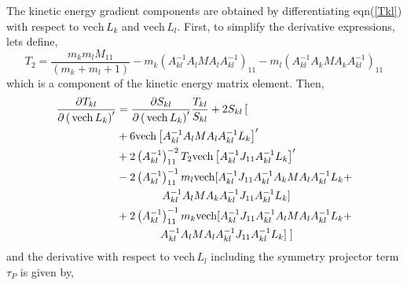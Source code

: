 \documentclass[12pt]{article}
\begin{document}
The kinetic energy gradient components are obtained by differentiating
eqn(\ref{Tkl}) with respect to $\mathrm{vech}\,L_{k}$ and $\mathrm{vech}%
\,L_{l}.$ First, to simplify the derivative expressions, lets define,
\begin{equation}
T_{2}=\frac{m_{k}m_{l}M_{11}}{\left(  m_{k}+m_{l}+1\right)  }-m_{k}\left(
A_{kl}^{-1}A_{l}MA_{l}A_{kl}^{-1}\right)  _{11}-m_{l}\left(  A_{kl}^{-1}%
A_{k}MA_{k}A_{kl}^{-1}\right)  _{11}%
\end{equation}
which is a component of the kinetic energy matrix element. Then,
\begin{align}
\frac{\partial T_{kl}}{\partial\left(  \,\mathrm{vech}\,L_{k}\right)
^{\prime}}  & =\frac{\partial S_{kl}}{\partial\left(  \,\mathrm{vech}%
\,L_{k}\right)  ^{\prime}}\frac{T_{kl}}{S_{kl}}+2S_{kl}\left[
\begin{array}
[c]{c}
\end{array}
\right.  \nonumber\\
& +6\mathrm{vech}\left[  A_{kl}^{-1}A_{l}MA_{l}A_{kl}^{-1}L_{k}\right]
^{\prime}\nonumber\\
& +2\left(  A_{kl}^{-1}\right)  _{11}^{-2}T_{2}\mathrm{vech}\left[
A_{kl}^{-1}J_{11}A_{kl}^{-1}L_{k}\right]  ^{\prime}\nonumber\\
& -2\left(  A_{kl}^{-1}\right)  _{11}^{-1}m_{l}\mathrm{vech[}A_{kl}^{-1}%
J_{11}A_{kl}^{-1}A_{k}MA_{l}A_{kl}^{-1}L_{k}+\nonumber\\
& \quad\quad\quad\,\quad A_{kl}^{-1}A_{l}MA_{k}A_{kl}^{-1}J_{11}A_{kl}%
^{-1}L_{k}]\nonumber\\
& +2\left(  A_{kl}^{-1}\right)  _{11}^{-1}m_{k}\mathrm{vech[}A_{kl}^{-1}%
J_{11}A_{kl}^{-1}A_{l}MA_{l}A_{kl}^{-1}L_{k}+\nonumber\\
& \quad\quad\quad\quad A_{kl}^{-1}A_{l}MA_{l}A_{kl}^{-1}J_{11}A_{kl}^{-1}%
L_{k}]\left.
\begin{array}
[c]{c}
\end{array}
\right]
\end{align}
and the derivative with respect to $\mathrm{vech}\,L_{l}$ including the
symmetry projector term $\tau_{P}$ is given by,
\end{document}
